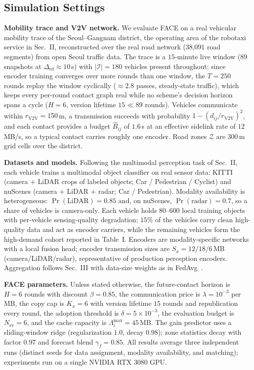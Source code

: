 \subsection{Simulation Settings}
\label{subsec:settings}

\textbf{Mobility trace and V2V network.}
We evaluate FACE on a real vehicular mobility trace of the
Seoul--Gangnam district, the operating area of the robotaxi service in
Sec.~II, reconstructed over the real road network (38{,}091 road
segments) from open Seoul traffic data. The trace is a $15$-minute
live window ($89$ snapshots at $\Delta_{\mathrm{rd}}\approx10$\,s)
with $|\mathcal I|=180$ vehicles present throughout; since encoder
training converges over more rounds than one window, the $T=250$
rounds replay the window cyclically ($\approx2.8$ passes,
steady-state traffic), which keeps every per-round contact graph
real while no scheme's decision horizon spans a cycle ($H=6$,
version lifetime $15\ll89$ rounds). Vehicles communicate within
$r_{\mathrm{V2V}}=150$\,m, a transmission succeeds with probability
$1-(d_{ij}/r_{\mathrm{V2V}})^2$, and each contact provides a budget
$\widehat B_{ij}$ of $1.6$\,s at an effective sidelink rate of
$12$\,MB/s, so a typical contact carries roughly one encoder. Road
zones $\mathcal Z$ are $300$\,m grid cells over the district.

\textbf{Datasets and models.}
Following the multimodal perception task of Sec.~II, each vehicle
trains a multimodal object classifier on real sensor data: KITTI
(camera $+$ LiDAR crops of labeled objects; Car / Pedestrian /
Cyclist) and nuScenes (camera $+$ LiDAR $+$ radar; Car / Pedestrian). Modality availability is
heterogeneous: $\Pr(\text{LiDAR})=0.85$ and, on nuScenes,
$\Pr(\text{radar})=0.7$, so a share of vehicles is camera-only. Each
vehicle holds $80$--$600$ local training objects with per-vehicle
sensing-quality degradation; $15\%$ of the vehicles carry clean
high-quality data and act as encoder carriers, while the remaining
vehicles form the high-demand cohort reported in Table~I. Encoders
are modality-specific networks with a local fusion head; encoder
transmission sizes are $S_x=12/18/6$\,MB (camera/LiDAR/radar),
representative of production perception encoders. Aggregation follows
Sec.~III with data-size weights as in FedAvg~\cite{fedavg}.

\textbf{FACE parameters.}
Unless stated otherwise, the future-contact horizon is $H=6$ rounds
with discount $\beta=0.85$, the communication price is
$\lambda=10^{-3}$ per MB, the copy cap is $K_x=6$ with version
lifetime $15$ rounds and republication every round, the adoption
threshold is $\delta=5\times10^{-3}$, the evaluation budget is
$N_{\mathrm{ev}}=6$, and the cache capacity is
$\Lambda_i^{\max}=45$\,MB. The gain predictor uses a sliding-window
ridge (regularization $1.0$, decay $0.98$); zone statistics decay with
factor $0.97$ and forecast blend $\gamma_f=0.85$. All results average
three independent runs (distinct seeds for data assignment, modality
availability, and matching); experiments run on a single NVIDIA RTX
3080 GPU.

